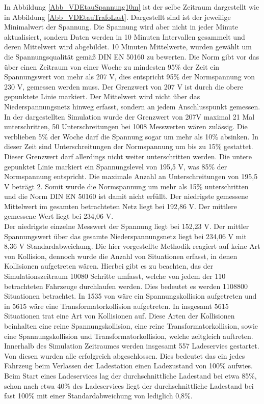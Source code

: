 In Abbildung \ref{Abb_VDEtauSpannung10m} ist der selbe Zeitraum dargestellt wie in Abbildung \ref{Abb_VDEtauTrafoLast}. Dargestellt sind ist der jeweilige Minimalwert der Spannung. Die Spannung wird aber nicht in jeder Minute aktualisiert, sondern Daten werden in 10 Minuten Intervallen gesammelt und deren Mittelwert wird abgebildet. 10 Minuten Mittelwerte, wurden gewählt um die Spannungsqualität gemäß DIN EN 50160 zu bewerten. Die Norm gibt vor das über einen Zeitraum von einer Woche zu mindesten 95\% der Zeit ein Spannungswert von mehr als 207 V, dies entspricht 95\% der Normspannung von 230 V, gemessen werden muss. Der Grenzwert von 207 V ist durch die obere gepunktete Linie markiert. Der Mittelwert wird nicht über das Niederspannungsnetz hinweg erfasst, sondern an jedem Anschlusspunkt gemessen. In der dargestellten Simulation wurde der Grenzwert von 207V maximal 21 Mal unterschritten, 50 Unterschreitungen bei 1008 Messwerten wären zulässig. Die verblieben 5\% der Woche darf die Spannung sogar um mehr als 10\% absinken. In dieser Zeit sind Unterschreitungen der Normspannung um bis zu 15\% gestattet. Dieser Grenzwert darf allerdings nicht weiter unterschritten werden. Die untere gepunktet Linie markiert ein Spannungslevel von 195,5 V, was 85\% der Normspannung entspricht. Die maximale Anzahl an Unterschreitungen von 195,5 V beträgt 2. Somit wurde die Normspannung um mehr als 15\% unterschritten und die Norm DIN EN 50160 ist damit nicht erfüllt. Der niedrigste gemessene Mittelwert im gesamten betrachteten Netz liegt bei 192,86 V. Der mittlere gemessene Wert liegt bei 234,06 V.\\
Der niedrigste einzelne Messwert der Spannung liegt bei 152,23 V. Der mittler Spannungswert über das gesamte Niederspannungsnetz liegt bei 234,06 V mit 8,36 V Standardabweichung. 
Die hier vorgestellte Methodik reagiert auf keine Art von Kollision, dennoch wurde die Anzahl von Situationen erfasst, in denen Kollisionen aufgetreten wären. Hierbei gibt es zu beachten, das der Simulationszeitraum 10080 Schritte umfasst, welche von jedem der 110 betrachteten Fahrzeuge durchlaufen werden. Dies bedeutet es werden 1108800 Situationen betrachtet. In 1535 von wäre ein Spannungskollision aufgetreten und in 5615 wäre eine Transformatorkollision aufgetreten. In insgesamt 5615 Situationen trat eine Art von Kollisionen auf. Diese Arten der Kollisionen beinhalten eine reine Spannungskollision, eine reine Transformatorkollision, sowie eine Spannungskollision und Transformatorkollision, welche zeitgleich auftreten.\\
Innerhalb des Simulation Zeitraumes werden insgesamt 557 Ladeservies gestartet. Von diesen wurden alle erfolgreich abgeschlossen. Dies bedeutet das ein jedes Fahrzeug beim Verlassen der Ladestation einen Ladezustand von 100\% aufwies. Beim Start eines Ladeservices lag der durchschnittliche Ladestand bei etwa 85\%, schon nach etwa 40\% des Ladeservices liegt der durchschnittliche Ladestand bei fast 100\% mit einer Standardabweichung von lediglich 0,8\%. \\
